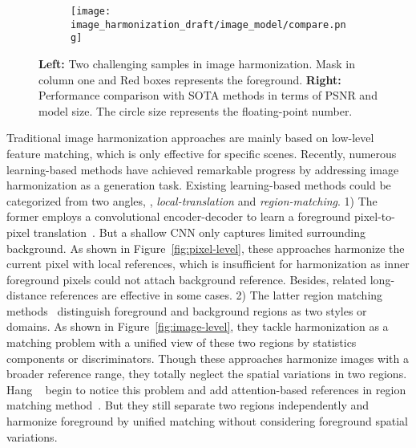 \documentclass[10pt,twocolumn,letterpaper]{article}
\begin{document}
\begin{figure*}[t]
\begin{subfigure}{0.67\linewidth}
{    }
    \setcounter{subfigure}{0}
    \label{fig:intro-example}
  \end{subfigure}
  \hspace{1pt}
  \begin{subfigure}{0.29\linewidth}
    \texttt{[image: image\_harmonization\_draft/image\_model/compare.png]}
    \label{fig:exampe_intro}
  \end{subfigure}
  \caption{\textbf{Left:} Two challenging samples in image harmonization. Mask in column one and Red boxes represents the foreground. \textbf{Right:} Performance comparison with SOTA methods in terms of PSNR and model size. The circle size represents the floating-point number.}
  \label{fig:intro_2}
\end{figure*}

Traditional image harmonization approaches are mainly based on low-level feature matching, which is only effective for specific scenes. Recently, numerous learning-based methods have achieved remarkable progress by addressing image harmonization as a generation task. Existing learning-based methods could be categorized from two angles, \ie, \textit{local-translation} and \textit{region-matching}. 1) The former employs a convolutional encoder-decoder to learn a foreground pixel-to-pixel translation~\cite{Tsai_2017_CVPR,cun_2020_TIP}. But a shallow CNN only captures limited surrounding background. As shown in Figure~\ref{fig:pixel-level}, these approaches harmonize the current pixel with local references, which is insufficient for harmonization as inner foreground pixels could not attach background reference. Besides, related long-distance references are effective in some cases. 2) The latter region matching methods~\cite{Ling_2021_CVPR,Cong_2020_CVPR} distinguish foreground and background regions as two styles or domains. As shown in Figure~\ref{fig:image-level}, they tackle harmonization as a matching problem with a unified view of these two regions by statistics components or discriminators. Though these approaches harmonize images with a broader reference range, they totally neglect the spatial variations in two regions. Hang \etal~\cite{Hang_2022_CVPR} begin to notice this problem and add attention-based references in region matching method~\cite{Ling_2021_CVPR}. 
But they still separate two regions independently and harmonize foreground by unified matching without considering foreground spatial variations.
\end{document}

